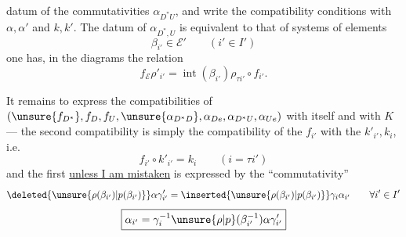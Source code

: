 
datum of the commutativities $\alpha_{D^*U}$, and write the compatibility conditions with $\alpha,\alpha'$ and $k,k'$. The datum of $\alpha_{D^*,U}$ is equivalent to that of systems of elements
\[
\boxed{\beta_{i'}\in\mathcal E'}\qquad(i'\in I')
\]
 one has, in the diagrams
the relation
\[
f_{\mathcal E}\rho'_{i'}=\operatorname{int}(\beta_{i'})\rho_{\tau i'}\circ f_{i'}.
\]

It remains to express the  compatibilities  of
$(\unsure{f_{D^*}},f_D,f_U,\unsure{\alpha_{D^*D}},\alpha_{De},\alpha_{D^*U},\alpha_{Ue})$ with
itself and with $K$ --- the second compatibility is simply the compatibility of the $f_{i'}$ with the $k'_{i'},k_i$, i.e.
\[
f_{i'}\circ k'_{i'}=k_i\qquad(i=\tau i')
\]
and the first \uline{unless I am mistaken} is expressed by the ``commutativity''
\[
\deleted{\unsure{\rho(\beta_{i'})|p(\beta_{i'})}}\alpha\gamma'_{i'}
 =\inserted{\unsure{\rho(\beta_{i'})|p(\beta_{i'})}}\gamma_i\alpha_{i'}
 \qquad\forall i'\in I'
\]
\[
\boxed{\alpha_{i'}=\gamma_i^{-1}\unsure{\rho|p}(\beta_{i'}^{-1})\alpha\gamma'_{i'}}
\]


